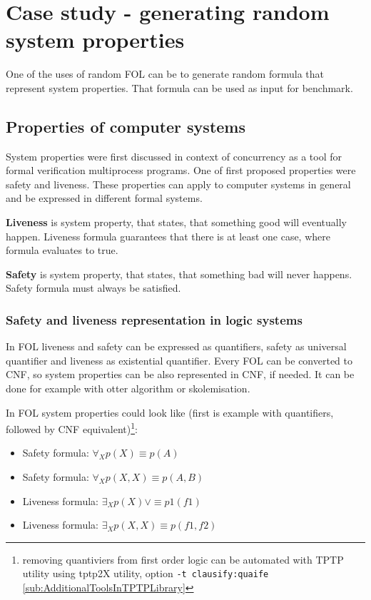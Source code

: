 \chapter{Case study - generating random system properties}

One of the uses of random \gls{FOL} can be to generate random formula that represent system properties. That formula can be used as input for benchmark.

\section{Properties of computer systems}

System properties were first discussed in context of concurrency \cite{Lampert77} as a tool for formal verification multiprocess programs. One of first proposed properties were safety and liveness. These properties can apply to computer systems in general and be expressed in different formal systems.

\textbf{Liveness} \cite{Klimek99} is system property, that states, that something good will eventually happen.
Liveness formula guarantees that there is at least one case, where formula evaluates to true.

\textbf{Safety} \cite{Klimek99} is system property, that states, that something bad will never happens.
Safety formula must always be satisfied.

\subsection{Safety and liveness representation in logic systems}

In \gls{FOL} liveness and safety can be expressed as quantifiers, safety as universal quantifier and liveness as existential quantifier. Every \gls{FOL} can be converted to \gls{CNF}, so system properties can be also represented in \gls{CNF}, if needed. It can be done for example with otter algorithm \cite{McC-Otter-URL} or skolemisation.

In \gls{FOL} system properties could look like (first is example with quantifiers, followed by CNF equivalent)\footnote{removing quantiviers from first order logic can be automated with TPTP utility using tptp2X utility, option \texttt{-t clausify:quaife} \ref{sub:AdditionalToolsInTPTPLibrary} }:
\begin{itemize}
  \item Safety formula: $\forall_X p(X) \equiv p(A)$
  \item Safety formula: $\forall_X p(X, X) \equiv p(A, B)$
  \item Liveness formula: $\exists_X p(X) \lor \equiv p1(f1)$
  \item Liveness formula: $\exists_X p(X, X) \equiv p(f1, f2)$
\end{itemize}

